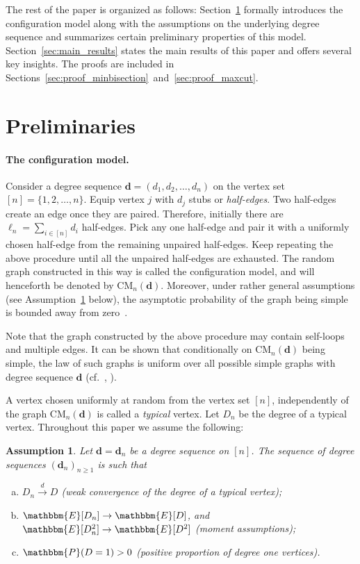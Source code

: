 \documentclass[11pt,a4paper, reqno]{article}
\numberwithin{equation}{section}
\numberwithin{equation}{section}
\newcommand{\dto}{\ensuremath{\xrightarrow{d}}}
\newcommand{\PR}{\ensuremath{\mathbbm{P}}}
\newcommand{\E}{\ensuremath{\mathbbm{E}}}
\newcommand{\1}{\ensuremath{\mathbbm{1}}}
\newcommand{\CM}{\ensuremath{\mathrm{CM}_n(\boldsymbol{d})}}
\newcommand{\bld}[1]{\boldsymbol{#1}}
\newtheorem{assumption}{Assumption}
\numberwithin{equation}{section}
\numberwithin{theorem}{section}
\begin{document}
The rest of the paper is organized as follows: Section~\ref{sec:model} formally introduces the configuration model along with the assumptions on the underlying degree sequence and summarizes certain preliminary properties of this model. 
Section~\ref{sec:main_results} states the main results of this paper 
and offers several key insights. 
The proofs are included in Sections~\ref{sec:proof_minbisection}~and~\ref{sec:proof_maxcut}. 




\section{Preliminaries}
\label{sec:model}

\paragraph{The configuration model.}
Consider a degree sequence $\bld{d}=(d_1,d_2,\dots,d_n)$ on the vertex set $[n]=\{1,2,\dots,n\}$. 
Equip vertex $j$ with $d_{j}$ stubs or \emph{half-edges}. Two half-edges create an edge once they are paired. 
Therefore, initially there are $\ell_n=\sum_{i \in [n]}d_i$ half-edges. 
Pick any one half-edge and pair it with a uniformly chosen half-edge from the remaining unpaired half-edges. 
Keep repeating the above procedure until all the unpaired half-edges are exhausted. 
The random graph constructed in this way is called the configuration model, and will henceforth be denoted by $\mathrm{CM}_{n}(\boldsymbol{d})$.
Moreover, under rather general assumptions (see Assumption~\ref{assumption1} below), the asymptotic probability of the graph being simple is bounded away from zero~\cite{J09c}.

  Note that the graph constructed by the above procedure may contain self-loops and multiple edges. It can be shown that conditionally on $\mathrm{CM}_{n}(\boldsymbol{d})$ being simple, the law of such graphs is uniform over all possible simple graphs with degree sequence $\boldsymbol{d}$ (cf.~\cite[Proposition 7.7]{RGCN1}, \cite{JKLP93}). 
  
A vertex chosen uniformly at random from the vertex set $[n]$, independently of the graph $\CM$ is called a \emph{typical} vertex.
  Let $D_n$ be the degree of a typical vertex. 
Throughout this paper we assume the following:
\begin{assumption}\label{assumption1}
\normalfont 
Let $\bld{d} = \bld{d}_n$ be a degree sequence on $[n]$. 
The sequence of degree sequences $(\bld{d}_n)_{n\geq 1}$ is such that
\begin{enumerate}[a.] 
\item \label{assumption1-1}  $D_n\dto D$ (\emph{weak convergence of the degree of a typical vertex});
\item \label{assumption1-2}  $\E[D_n]\to \E[D]$, and $\E[D_n^2]\to\E[D^2]$ (\emph{moment assumptions});
\item \label{assumption1-3} $\PR(D=1)>0$ (\emph{positive proportion of degree one vertices}).
\end{enumerate}
\end{assumption} 
\end{document}
